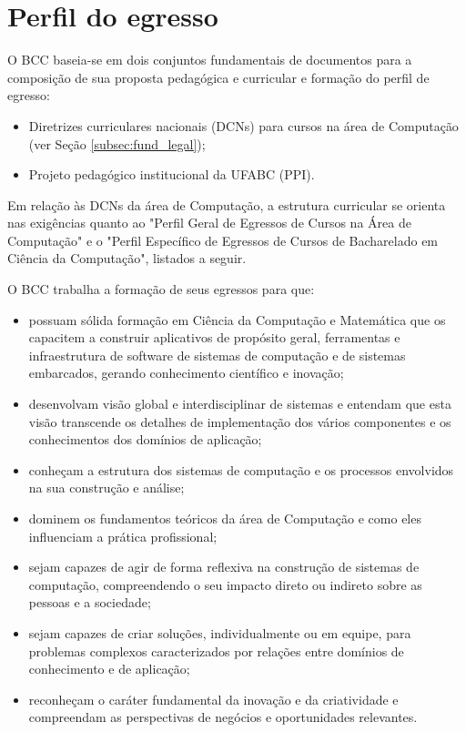 \section{Perfil do egresso}
\label{sec:perfil_egresso}

O BCC baseia-se em dois conjuntos fundamentais de documentos para a composição de sua proposta pedagógica e curricular e formação do perfil de egresso:
\begin{itemize}
	\item Diretrizes curriculares nacionais (DCNs) para cursos na área de Computação (ver Seção \ref{subsec:fund_legal});
	\item Projeto pedagógico institucional da UFABC (PPI).
\end{itemize}

Em relação às DCNs da área de Computação, a estrutura curricular se orienta nas exigências quanto ao "Perfil Geral de Egressos de Cursos na Área de Computação" e o "Perfil Específico de Egressos de Cursos de Bacharelado em Ciência da Computação", listados a seguir. 

O BCC trabalha a formação de seus egressos para que:
\begin{itemize}
	\item possuam sólida formação em Ciência da Computação e Matemática que os capacitem a construir aplicativos de propósito geral, ferramentas e infraestrutura de software de sistemas de computação e de sistemas embarcados, gerando conhecimento científico e inovação;
	\item desenvolvam visão global e interdisciplinar de sistemas e entendam que esta visão transcende os detalhes de implementação dos vários componentes e os conhecimentos	dos domínios de aplicação;
	\item conheçam a estrutura dos sistemas de computação e os processos envolvidos na sua construção e análise;
	\item dominem os fundamentos teóricos da área de Computação e como eles influenciam a prática profissional;
	\item sejam capazes de agir de forma reflexiva na construção de sistemas de computação, compreendendo o seu impacto direto ou indireto sobre as pessoas e a sociedade;
	\item sejam capazes de criar soluções, individualmente ou em equipe, para problemas complexos caracterizados por relações entre domínios de conhecimento e de aplicação;
	\item reconheçam o caráter fundamental da inovação e da criatividade e compreendam as perspectivas de negócios e oportunidades relevantes.
\end{itemize}

